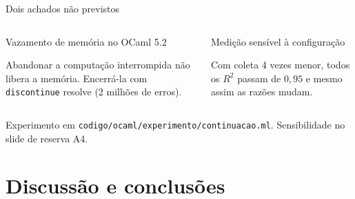 \documentclass[aspectratio=169,10pt]{beamer}
\newcommand{\oc}[1]{\textcolor{ocamlc}{#1}}
\begin{document}
\begin{frame}{Dois achados não previstos}
  \begin{columns}[T]
    \begin{block}{Vazamento de memória no OCaml 5.2}
      \centering {\Large \oc{\textbf{1,2 GB $\rightarrow$ 6 MB}}}\\[4pt]
      \raggedright
      Abandonar a computação interrompida não libera a memória. Encerrá-la com \texttt{discontinue} resolve (2 milhões de erros).
    \end{block}
    \begin{block}{Medição sensível à configuração}
      \\[4pt]
      \raggedright
      Com coleta 4 vezes menor, todos os $R^2$ passam de $0{,}95$ e mesmo assim as razões mudam.
    \end{block}
  \end{columns}
  \vfill
  {\small\color{neutral} Experimento em \texttt{codigo/ocaml/experimento/continuacao.ml}. Sensibilidade no slide de reserva A4.}
\end{frame}

\section{Discussão e conclusões}
\end{document}
